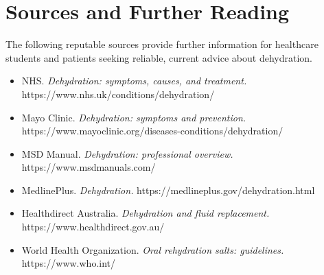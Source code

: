 \section*{Sources and Further Reading}
The following reputable sources provide further information for healthcare students and patients seeking reliable, current advice about dehydration.

\begin{itemize}
    \item NHS. \textit{Dehydration: symptoms, causes, and treatment.} https://www.nhs.uk/conditions/dehydration/
    \item Mayo Clinic. \textit{Dehydration: symptoms and prevention.} https://www.mayoclinic.org/diseases-conditions/dehydration/
    \item MSD Manual. \textit{Dehydration: professional overview.} https://www.msdmanuals.com/
    \item MedlinePlus. \textit{Dehydration.} https://medlineplus.gov/dehydration.html
    \item Healthdirect Australia. \textit{Dehydration and fluid replacement.} https://www.healthdirect.gov.au/
    \item World Health Organization. \textit{Oral rehydration salts: guidelines.} https://www.who.int/
\end{itemize}
